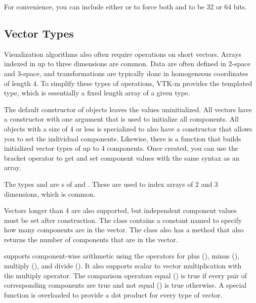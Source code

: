 For convenience, you can include either
 or
 to force both  and
 to be 32 or 64 bits.

\subsection{Vector Types}
\label{sec:VectorTypes}

Visualization algorithms also often require operations on short vectors.
Arrays indexed in up to three dimensions are common. Data are often defined
in 2-space and 3-space, and transformations are typically done in
homogeneous coordinates of length 4. To simplify these types of operations,
VTK-m provides the  templated type, which is
essentially a fixed length array of a given type.

The default constructor of  objects leaves the values
uninitialized. All vectors have a constructor with one argument that is
used to initialize all components. All  objects with a size of 4
or less is specialized to also have a constructor that allows you to set
the individual components. Likewise, there is a  function
that builds initialized vector types of up to 4 components. Once created,
you can use the bracket operator to get and set component values with the
same syntax as an array.


The types  and  are s of
 and . These
are used to index arrays of 2 and 3 dimensions, which is common.

Vectors longer than 4 are also supported, but independent component values must be set after construction.
The  class contains a constant named  to specify how many components are in the vector.
The class also has a  method that also returns the number of components that are in the vector.


 supports component-wise arithmetic using the operators
for plus (\textcode{+}), minus (\textcode{-}), multiply (\textcode{*}), and
divide (\textcode{/}). It also supports scalar to vector multiplication
with the multiply operator. The comparison operators equal (\textcode{==})
is true if every pair of corresponding components are true and not equal
(\textcode{!=}) is true otherwise. A special  function is
overloaded to provide a dot product for every type of vector.

